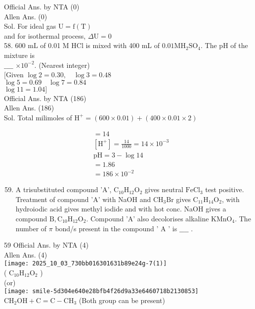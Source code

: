 \documentclass[10pt]{article}
\begin{document}
Official Ans. by NTA (0)\\
Allen Ans. (0)\\
Sol. For ideal gas \(\mathrm{U}=\mathrm{f}(\mathrm{T})\)\\
and for isothermal process, \(\Delta \mathrm{U}=0\)\\
58. 600 mL of 0.01 M HCl is mixed with 400 mL of \(0.01 \mathrm{M} \mathrm{H}_{2} \mathrm{SO}_{4}\). The pH of the mixture is\\
\(\_\_\_\_\) \(\times 10^{-2}\). (Nearest integer)\\[0pt]
[Given \(\log 2=0.30, \quad \log 3=0.48\)\\
\(\log 5=0.69 \quad \log 7=0.84\)\\
\(\log 11=1.04]\)\\
Official Ans. by NTA (186)\\
Allen Ans. (186)\\
Sol. Total milimoles of \(\mathrm{H}^{+}=(600 \times 0.01)+(400 \times 0.01 \times 2)\)

\[
\begin{aligned}
& =14 \\
& {\left[\mathrm{H}^{+}\right]=\frac{14}{1000}=14 \times 10^{-3}} \\
& \mathrm{pH}=3-\log 14 \\
& =1.86 \\
& =186 \times 10^{-2}
\end{aligned}
\]

\begin{enumerate}
  \setcounter{enumi}{58}
  \item A trisubstituted compound 'A', \(\mathrm{C}_{10} \mathrm{H}_{12} \mathrm{O}_{2}\) gives neutral \(\mathrm{FeCl}_{3}\) test positive. Treatment of compound 'A' with NaOH and \(\mathrm{CH}_{3} \mathrm{Br}\) gives \(\mathrm{C}_{11} \mathrm{H}_{14} \mathrm{O}_{2}\), with hydroiodic acid gives methyl iodide and with hot conc. NaOH gives a compound \(\mathrm{B}, \mathrm{C}_{10} \mathrm{H}_{12} \mathrm{O}_{2}\). Compound 'A' also decolorises alkaline \(\mathrm{KMnO}_{4}\). The number of \(\pi\) bond/s present in the compound ' A ' is \(\_\_\_\_\) .
\end{enumerate}

59 Official Ans. by NTA (4)\\
Allen Ans. (4)\\
\texttt{[image: 2025\_10\_03\_730bb016301631b89e24g-7(1)]}\\
( \(\mathrm{C}_{10} \mathrm{H}_{12} \mathrm{O}_{2}\) )\\
(or)\\
\texttt{[image: smile-5d304e640e28bfb4f26d9a33e6460718b2130853]}\\
\(\mathrm{CH}_{2} \mathrm{OH}+\mathrm{C}=\mathrm{C}-\mathrm{CH}_{3}\) (Both group can be present)
\end{document}
